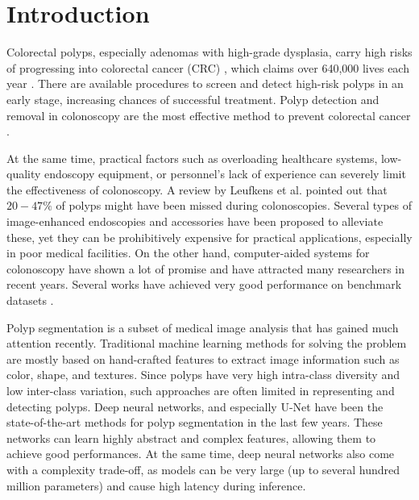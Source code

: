 \documentclass{ieeeaccess}
\begin{document}
\titlepgskip=-15pt

\maketitle

\section{Introduction}



Colorectal polyps, especially adenomas with high-grade dysplasia, carry high risks of progressing into colorectal cancer (CRC) \cite{gschwantler2002high}, which claims over 640,000 lives each year \cite{bernal2017comparative}. There are available procedures to screen and detect high-risk polyps in an early stage, increasing chances of successful treatment. Polyp detection and removal in colonoscopy are the most effective method to prevent colorectal cancer \cite{issa2017colorectal}.

At the same time, practical factors such as overloading healthcare systems, low-quality endoscopy equipment, or personnel's lack of experience \cite{armin2015visibility,lee2008adequate} can severely limit the effectiveness of colonoscopy. A review by Leufkens et al. \cite{leufkens2012factors} pointed out that $20-47\%$ of polyps might have been missed during colonoscopies. Several types of image-enhanced endoscopies and accessories have been proposed to alleviate these, yet they can be prohibitively expensive for practical applications, especially in poor medical facilities. On the other hand, computer-aided systems for colonoscopy have shown a lot of promise and have attracted many researchers in recent years. Several works have achieved very good performance on benchmark datasets \cite{fan2020pranet,huang2021hardnet,tang2019cu}.

Polyp segmentation is a subset of medical image analysis that has gained much attention recently. Traditional machine learning methods for solving the problem are mostly based on hand-crafted features \cite{iwahori2013automatic,silva2014toward} to extract image information such as color, shape, and textures. Since polyps have very high intra-class diversity and low inter-class variation, such approaches are often limited in representing and detecting polyps. Deep neural networks, and especially U-Net \cite{ronneberger2015u} have been the state-of-the-art methods for polyp segmentation in the last few years. These networks can learn highly abstract and complex features, allowing them to achieve good performances. At the same time, deep neural networks also come with a complexity trade-off, as models can be very large (up to several hundred million parameters) and cause high latency during inference.
\end{document}
